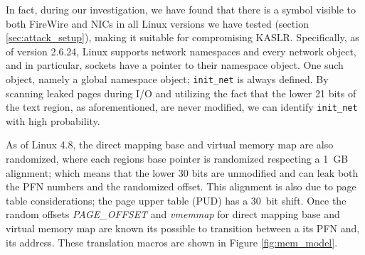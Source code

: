 In fact, during our investigation, we have found that there is a symbol visible to both FireWire and NICs in all Linux versions we have tested (section \ref{sec:attack_setup}), making it suitable for compromising KASLR. Specifically, as of version 2.6.24, Linux supports network namespaces and every network object, and in particular, sockets have a pointer to their namespace object. One such object, namely a global namespace object; \texttt{init\_net} is always defined. By scanning leaked pages during I/O and utilizing the fact that the lower 21 bits of the text region, as aforementioned, are never modified, we can identify \texttt{init\_net} with high probability.

As of Linux 4.8, the direct mapping base and virtual memory map are also randomized, where each regions base pointer is randomized respecting a 1~GB alignment; which means that the lower 30 bits are unmodified and can leak both the PFN numbers and the randomized offset. This alignment is also due to page table considerations; the page upper table (PUD) has a 30~bit shift. Once the random offsets \textit{PAGE\_OFFSET} and \textit{vmemmap} for direct mapping base and virtual memory map are known its possible to transition between a \kva{} its PFN and, its \page{} address. These translation macros are shown in Figure \ref{fig:mem_model}.
